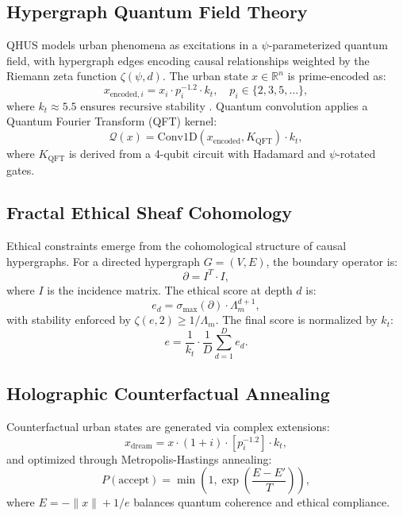 \documentclass[11pt, a4paper]{article}
\theoremstyle{plain}
\newcommand{\LambdaM}{\Lambda_m}
\newcommand{\kt}{k_t}
\newcommand{\Zeta}{\zeta}
\newcommand{\Qcal}{\mathcal{Q}}
\begin{document}
{\subsection{Hypergraph Quantum Field Theory}
QHUS models urban phenomena as excitations in a \(\psi\)-parameterized quantum field, with hypergraph edges encoding causal relationships weighted by the Riemann zeta function \(\Zeta(\psi, d)\). The urban state \(x \in \mathbb{R}^n\) is prime-encoded as:
\begin{equation}
    x_{\text{encoded}, i} = x_i \cdot p_i^{-1.2} \cdot \kt, \quad p_i \in \{2, 3, 5, \dots\},
\end{equation}
where \(\kt \approx 5.5\) ensures recursive stability \cite{russel2024pirtm}. Quantum convolution applies a Quantum Fourier Transform (QFT) kernel:
\begin{equation}
    \Qcal(x) = \text{Conv1D}(x_{\text{encoded}}, K_{\text{QFT}}) \cdot \kt,
\end{equation}
where \(K_{\text{QFT}}\) is derived from a 4-qubit circuit with Hadamard and \(\psi\)-rotated gates.

\subsection{Fractal Ethical Sheaf Cohomology}
Ethical constraints emerge from the cohomological structure of causal hypergraphs. For a directed hypergraph \(G = (V, E)\), the boundary operator is:
\begin{equation}
    \partial = I^T \cdot I,
\end{equation}
where \(I\) is the incidence matrix. The ethical score at depth \(d\) is:
\begin{equation}
    e_d = \sigma_{\text{max}}(\partial) \cdot \LambdaM^{d+1},
\end{equation}
with stability enforced by \(\Zeta(e, 2) \geq 1/\LambdaM\). The final score is normalized by \(\kt\):
\begin{equation}
    e = \frac{1}{\kt} \cdot \frac{1}{D} \sum_{d=1}^D e_d.
\end{equation}

\subsection{Holographic Counterfactual Annealing}
Counterfactual urban states are generated via complex extensions:
\begin{equation}
    x_{\text{dream}} = x \cdot (1 + i) \cdot [p_i^{-1.2}] \cdot \kt,
\end{equation}
and optimized through Metropolis-Hastings annealing:
\begin{equation}
    P(\text{accept}) = \min\left(1, \exp\left(\frac{E - E'}{T}\right)\right),
\end{equation}
where \(E = -\lVert x \rVert + 1/e\) balances quantum coherence and ethical compliance.



}
\end{document}
